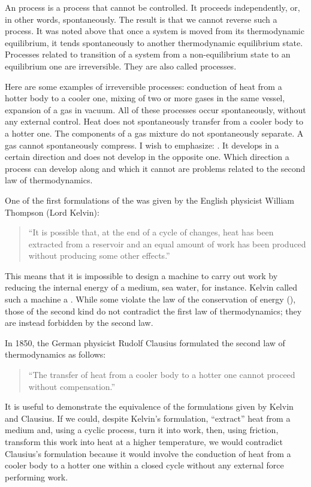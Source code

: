An  process is a process that cannot be controlled. It proceeds independently, or, in other words, spontaneously. The result is that we cannot reverse such a process. It was noted above that once a system is moved from its thermodynamic equilibrium, it tends spontaneously to another thermodynamic equilibrium state. Processes related to transition of a system from a non-equilibrium state to an equilibrium one are irreversible. They are also called  processes.

Here are some examples of irreversible processes: conduction of heat from a hotter body to a cooler one, mixing of two or more gases in the same vessel, expansion of a gas in vacuum. All of these processes occur spontaneously, without any external control. Heat does not spontaneously transfer from a cooler body to a hotter one. The components of a gas mixture do not spontaneously separate. A gas cannot spontaneously compress. I wish to emphasize: . It develops in a certain direction and does not develop in the opposite one. Which direction a process can develop along and which it cannot are problems related to the second law of thermodynamics.

 One of the first formulations of the  was given by the English physicist William Thompson (Lord Kelvin):
\begin{quote}
``It is  possible that, at the end of a cycle of changes, heat has been extracted from a reservoir and an equal amount of work has been produced without producing some other effects.''
\end{quote}
This means that it is impossible to design a machine to carry out work by reducing the internal energy of a medium, sea water, for instance. Kelvin called such a machine a . While some  violate the law of the conservation of energy (), those of the second kind do not contradict the first law of thermodynamics; they are instead forbidden by the second law.	

In 1850, the German physicist Rudolf Clausius formulated the second law of thermodynamics as follows: 
\begin{quote}
``The transfer of heat from a cooler body to a hotter one cannot proceed without compensation.'' 
\end{quote}
It is useful to demonstrate the equivalence of the formulations given by Kelvin and Clausius. If we could, despite Kelvin's formulation, ``extract'' heat from a medium and, using a cyclic process, turn it into work, then, using friction, transform this work into heat at a higher temperature, we would contradict Clausius's formulation because it would involve the conduction of heat from a cooler body to a hotter one within a closed cycle without any external force performing work.

